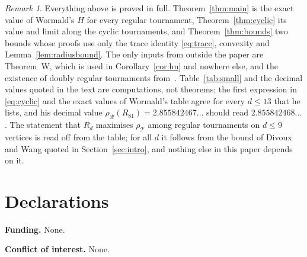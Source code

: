 \documentclass[11pt,a4paper,reqno]{amsart}
\theoremstyle{remark}
\newtheorem{remark}[theorem]{Remark}
\numberwithin{equation}{section}
\newcommand{\cT}{\mathcal{T}}
\newcommand{\cR}{\mathcal{R}}
\begin{document}
\begin{remark}\label{rem:scope}
Everything above is proved in full. Theorem~\ref{thm:main} is the exact value of Wormald's $H$ for every regular tournament, Theorem~\ref{thm:cyclic} its value and limit along the cyclic tournaments, and Theorem~\ref{thm:bounds} two bounds whose proofs use only the trace identity \eqref{eq:trace}, convexity and Lemma~\ref{lem:radiusbound}. The only inputs from outside the paper are Theorem~W, which is used in Corollary~\ref{cor:hn} and nowhere else, and the existence of doubly regular tournaments from~\cite{RB}. Table~\ref{tab:small} and the decimal values quoted in the text are computations, not theorems; the first expression in \eqref{eq:cyclic} and the exact values of Wormald's table agree for every $d\le13$ that he lists, and his decimal value $\rho_\cR(R_{81})=2.855842467\ldots$ should read $2.855842468\ldots$. The statement that $R_d$ maximises $\rho_\cT$ among regular tournaments on $d\le9$ vertices is read off from the table; for all $d$ it follows from the bound of Divoux and Wang quoted in Section~\ref{sec:intro}, and nothing else in this paper depends on it.
\end{remark}

\section*{Declarations}

\noindent\textbf{Funding.} None.

\smallskip
\noindent\textbf{Conflict of interest.} None.
\end{document}
